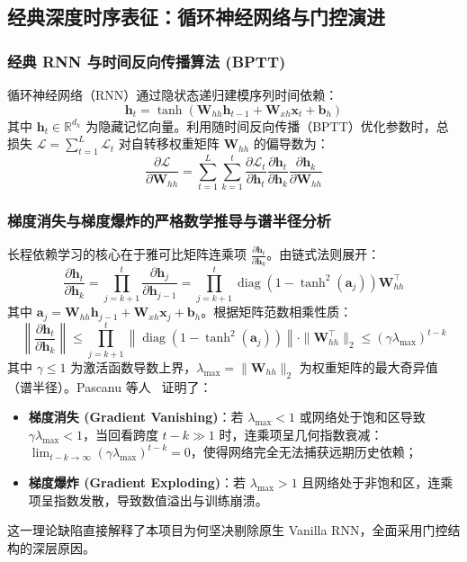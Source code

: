 \subsection{经典深度时序表征：循环神经网络与门控演进}
\label{subsec:rnn_zh}

\subsubsection{经典 RNN 与时间反向传播算法 (BPTT)}
循环神经网络（RNN）通过隐状态递归建模序列时间依赖：
\begin{equation}
    \mathbf{h}_t = \tanh(\mathbf{W}_{hh} \mathbf{h}_{t-1} + \mathbf{W}_{xh} \mathbf{x}_t + \mathbf{b}_h)
\end{equation}
其中 $\mathbf{h}_t \in \mathbb{R}^{d_h}$ 为隐藏记忆向量。利用随时间反向传播（BPTT）优化参数时，总损失 $\mathcal{L} = \sum_{t=1}^L \mathcal{L}_t$ 对自转移权重矩阵 $\mathbf{W}_{hh}$ 的偏导数为：
\begin{equation}
    \frac{\partial \mathcal{L}}{\partial \mathbf{W}_{hh}} = \sum_{t=1}^L \sum_{k=1}^t \frac{\partial \mathcal{L}_t}{\partial \mathbf{h}_t} \frac{\partial \mathbf{h}_t}{\partial \mathbf{h}_k} \frac{\partial \mathbf{h}_k}{\partial \mathbf{W}_{hh}}
\end{equation}

\subsubsection{梯度消失与梯度爆炸的严格数学推导与谱半径分析}
长程依赖学习的核心在于雅可比矩阵连乘项 $\frac{\partial \mathbf{h}_t}{\partial \mathbf{h}_k}$。由链式法则展开：
\begin{equation}
    \frac{\partial \mathbf{h}_t}{\partial \mathbf{h}_k} = \prod_{j=k+1}^t \frac{\partial \mathbf{h}_j}{\partial \mathbf{h}_{j-1}} = \prod_{j=k+1}^t \operatorname{diag}\left(1 - \tanh^2(\mathbf{a}_j)\right) \mathbf{W}_{hh}^\top
\end{equation}
其中 $\mathbf{a}_j = \mathbf{W}_{hh} \mathbf{h}_{j-1} + \mathbf{W}_{xh} \mathbf{x}_j + \mathbf{b}_h$。根据矩阵范数相乘性质：
\begin{equation}
    \left\| \frac{\partial \mathbf{h}_t}{\partial \mathbf{h}_k} \right\| \le \prod_{j=k+1}^t \left\| \operatorname{diag}\left(1 - \tanh^2(\mathbf{a}_j)\right) \right\| \cdot \|\mathbf{W}_{hh}^\top\|_2 \le (\gamma \lambda_{\max})^{t - k}
\end{equation}
其中 $\gamma \le 1$ 为激活函数导数上界，$\lambda_{\max} = \|\mathbf{W}_{hh}\|_2$ 为权重矩阵的最大奇异值（谱半径）。Pascanu 等人~\cite{pascanu2013difficulty} 证明了：
\begin{itemize}
    \item \textbf{梯度消失 (Gradient Vanishing)}：若 $\lambda_{\max} < 1$ 或网络处于饱和区导致 $\gamma \lambda_{\max} < 1$，当回看跨度 $t - k \gg 1$ 时，连乘项呈几何指数衰减：$\lim_{t-k \to \infty} (\gamma \lambda_{\max})^{t-k} = 0$，使得网络完全无法捕获远期历史依赖；
    \item \textbf{梯度爆炸 (Gradient Exploding)}：若 $\lambda_{\max} > 1$ 且网络处于非饱和区，连乘项呈指数发散，导致数值溢出与训练崩溃。
\end{itemize}
这一理论缺陷直接解释了本项目为何坚决剔除原生 Vanilla RNN，全面采用门控结构的深层原因。

